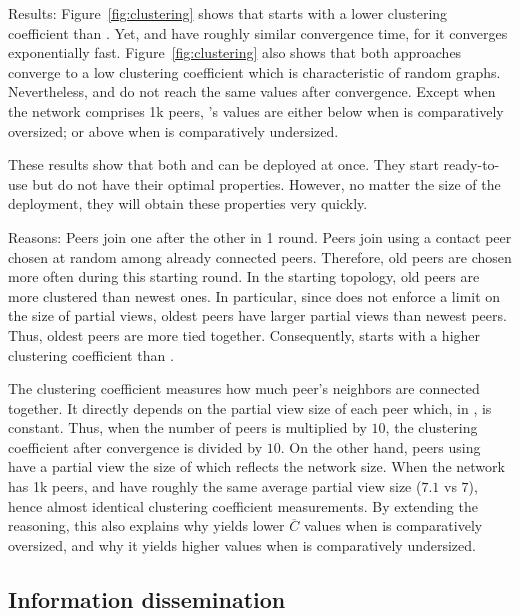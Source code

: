 \begin{asparadesc}
\item[Results:] Figure~\ref{fig:clustering} shows that \CYCLON starts with a
  lower clustering coefficient than \SPRAY.  Yet, \CYCLON and \SPRAY have
  roughly similar convergence time, for it converges exponentially fast.
  Figure~\ref{fig:clustering} also shows that both approaches converge to a low
  clustering coefficient which is characteristic of random graphs. Nevertheless,
  \CYCLON and \SPRAY do not reach the same values after convergence. Except when
  the network comprises 1k peers, \SPRAY's values are either below when \CYCLON
  is comparatively oversized; or above when \CYCLON is comparatively undersized.
  
  These results show that both \SPRAY and \CYCLON can be deployed at once. They
  start ready-to-use but do not have their optimal properties. However, no
  matter the size of the deployment, they will obtain these properties very
  quickly.

\item[Reasons:] Peers join one after the other in 1 round. Peers join using a
  contact peer chosen at random among already connected peers. Therefore, old
  peers are chosen more often during this starting round. In the starting
  topology, old peers are more clustered than newest ones. In particular, since
  \SPRAY does not enforce a limit on the size of partial views, oldest peers
  have larger partial views than newest peers. Thus, oldest peers are more tied
  together. Consequently, \SPRAY starts with a higher clustering coefficient
  than \CYCLON. 

  The clustering coefficient measures how much peer's neighbors are connected
  together. It directly depends on the partial view size of each peer which, in
  \CYCLON, is constant. Thus, when the number of peers is multiplied by $10$,
  the clustering coefficient after convergence is divided by $10$. On the other
  hand, peers using \SPRAY have a partial view the size of which reflects the
  network size. When the network has 1k peers, \SPRAY and \CYCLON have roughly
  the same average partial view size (\SPRAY $7.1$ vs \CYCLON $7$), hence almost
  identical clustering coefficient measurements. By extending the reasoning,
  this also explains why \SPRAY yields lower $\overline{C}$ values when \CYCLON
  is comparatively oversized, and why it yields higher values when \CYCLON is
  comparatively undersized.
\end{asparadesc}


\subsection{Information dissemination}


